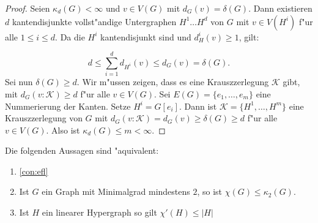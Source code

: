\begin{proof}
  Seien $\kappa_d(G) <\infty$ und $v\in V(G)$ mit $d_{G}(v) = \delta(G)$. Dann existieren $d$ kantendisjunkte vollst"andige Untergraphen $H^{1}\dots H^{d}$ von $G$ mit $v\in V(H^{i})$ f"ur alle $1\leq i \leq d$. Da die $H^{i}$ kantendisjunkt sind und $d_H^{i}(v)\geq1$, gilt: 

  \[
    d \leq \sum\limits_{i=1}^{d} d_{H^{i}}(v) \leq d_G(v) = \delta(G). 
  \]
  Sei nun $\delta(G) \geq d$. Wir m"ussen zeigen, dass es eine Krauszzerlegung $\mathcal{K}$ gibt, mit $d_{G}(v:\mathcal{K}) \geq d$ f"ur alle $v\in V(G)$. Sei $E(G)= \{e_1,\dots, e_{m}\}$ eine Nummerierung der Kanten. Setze $H^{i}= G[e_i]$. Dann ist $\mathcal{K} = \{H^{1},\dots, H^{m}\}$ eine Krauszzerlegung von $G$ mit $d_{G}(v:\mathcal{K}) = d_{G}(v) \geq \delta(G) \geq d$ f"ur alle $v\in V(G)$. Also ist $\kappa_d(G)\leq m <\infty$.

\end{proof}
\begin{theorem}
  Die folgenden Aussagen sind "aquivalent:
  \begin{enumerate}
    \item \ref{con:efl}
    \item Ist $G$ ein Graph mit Minimalgrad mindestens $2$, so ist $\chi(G) \leq \kappa_{2}(G)$.
    \item Ist $H$ ein linearer Hypergraph so gilt $\chi'(H)\leq |H|$
  \end{enumerate}
  \label{thm:equivefl}
\end{theorem}

